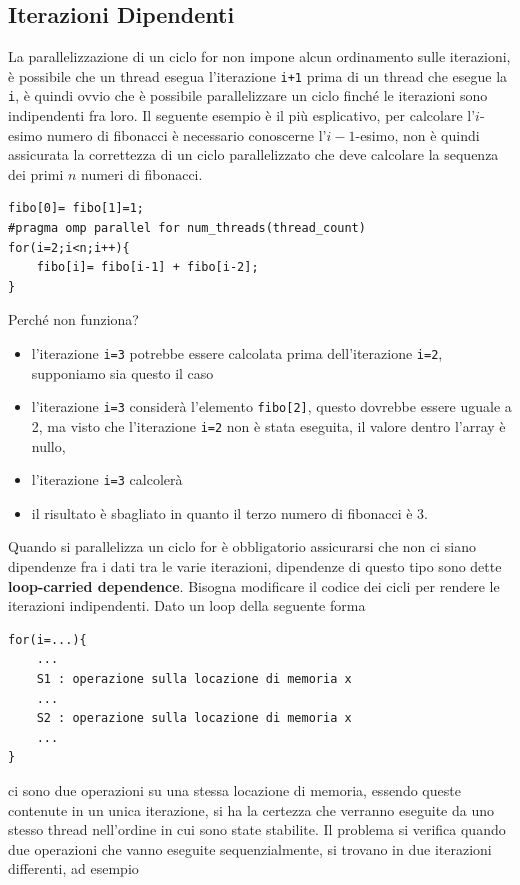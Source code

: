 \documentclass[10pt, letterpaper]{report}
\begin{document}
\subsection{Iterazioni Dipendenti}
La parallelizzazione di un ciclo for non impone alcun ordinamento sulle iterazioni, è possibile che un thread esegua l'iterazione \texttt{i+1} prima di un thread che esegue la \texttt{i}, è quindi ovvio che è possibile parallelizzare un ciclo finché le iterazioni sono indipendenti fra loro.\acc 
Il seguente esempio è il più esplicativo, per calcolare l'$i$-esimo numero di fibonacci è necessario conoscerne l'$i-1$-esimo, non è quindi assicurata la correttezza di un ciclo parallelizzato che deve calcolare la sequenza dei primi $n$ numeri di fibonacci.
\begin{lstlisting}[style=CStyle]
fibo[0]= fibo[1]=1;
#pragma omp parallel for num_threads(thread_count) 
for(i=2;i<n;i++){
    fibo[i]= fibo[i-1] + fibo[i-2];
}
\end{lstlisting}
Perché non funziona? \begin{itemize}
   \item l'iterazione \texttt{i=3} potrebbe essere calcolata prima dell'iterazione \texttt{i=2}, supponiamo sia questo il caso 
   \item l'iterazione \texttt{i=3} considerà l'elemento \texttt{fibo[2]}, questo dovrebbe essere uguale a 2, ma visto che l'iterazione \texttt{i=2} non è stata eseguita, il valore dentro l'array è nullo, 
   \item l'iterazione \texttt{i=3} calcolerà  
   \item il risultato è sbagliato in quanto il terzo numero di fibonacci è 3.
\end{itemize}
Quando si parallelizza un ciclo for è obbligatorio assicurarsi che non ci siano dipendenze fra i dati tra le varie iterazioni, dipendenze di questo tipo sono dette \textbf{loop-carried dependence}. Bisogna modificare il codice dei cicli per rendere le iterazioni indipendenti.\acc 
Dato un loop della seguente forma
\begin{lstlisting}[style=CStyle]
for(i=...){
    ... 
    S1 : operazione sulla locazione di memoria x
    ... 
    S2 : operazione sulla locazione di memoria x
    ...
}
\end{lstlisting}
ci sono due operazioni su una stessa locazione di memoria, essendo queste contenute in un unica iterazione, si ha la certezza che verranno eseguite da uno stesso thread nell'ordine in cui sono state stabilite. Il problema si verifica quando due operazioni che vanno eseguite sequenzialmente, si trovano in due iterazioni differenti, ad esempio
\end{document}
